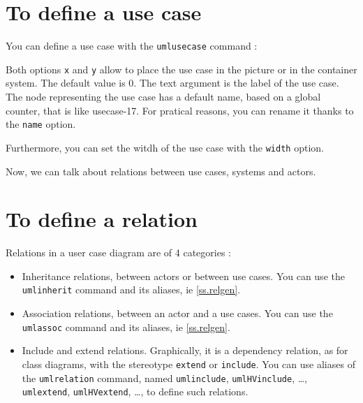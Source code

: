 \documentclass[a4paper,11pt]{report}
\newcommand{\inputTikZ}[1]{%
  }%
\newcommand{\inputTikZ}[1]{%
    \texttt{[image: fig/\#1.pdf]}%
  }%
\begin{document}
\section{To define a use case}\label{s.usecase}

You can define a use case with the {\tt umlusecase} command :

\medskip

\begin{minipage}{0.5\textwidth}

\end{minipage}
\begin{minipage}{0.5\textwidth}
\begin{center}
\inputTikZ{usecase}
\end{center}
\end{minipage}

\medskip

Both options {\tt x} and {\tt y} allow to place the use case in the picture or in the container system. The default value is 0. The text argument is the label of the use case. The node representing the use case has a default name, based on a global counter, that is like usecase-17. For pratical reasons, you can rename it thanks to the {\tt name} option.

Furthermore, you can set the witdh of the use case with the {\tt width} option.

\medskip

Now, we can talk about relations between use cases, systems and actors.

\section{To define a relation}\label{s.userel}

Relations in a user case diagram are of 4 categories :

\begin{itemize}
\item Inheritance relations, between actors or between use cases. You can use the {\tt umlinherit} command and its aliases, ie \autoref{ss.relgen}.
\item Association relations, between an actor and a use cases. You can use the {\tt umlassoc} command and its aliases, ie \autoref{ss.relgen}.
\item Include and extend relations. Graphically, it is a dependency relation, as for class diagrams, with the stereotype {\tt extend} or {\tt include}. You can use aliases of the {\tt umlrelation} command, named 
{\tt umlinclude}, {\tt umlHVinclude}, \ldots, {\tt umlextend}, {\tt umlHVextend}, \ldots, to define such relations.
\end{itemize}
\end{document}
